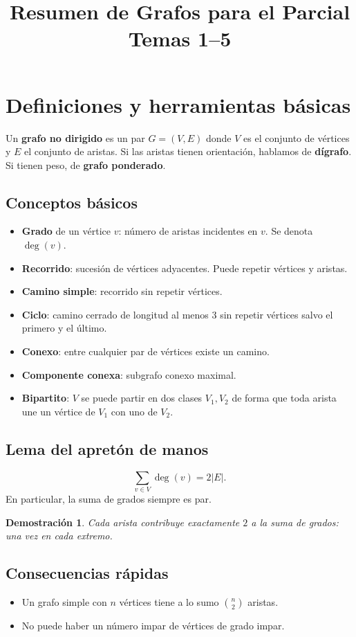 \documentclass[11pt,a4paper]{article}
\title{Resumen de Grafos para el Parcial\\\large Temas 1--5}
\author{}
\date{}
\newtheorem*{dem}{Demostración}
\begin{document}
\maketitle
\tableofcontents
\bigskip

\section{Definiciones y herramientas básicas}

Un \textbf{grafo no dirigido} es un par $G=(V,E)$ donde $V$ es el conjunto de vértices y $E$ el conjunto de aristas. Si las aristas tienen orientación, hablamos de \textbf{dígrafo}. Si tienen peso, de \textbf{grafo ponderado}.

\subsection*{Conceptos básicos}
\begin{itemize}
    \item \textbf{Grado} de un vértice $v$: número de aristas incidentes en $v$. Se denota $\deg(v)$.
    \item \textbf{Recorrido}: sucesión de vértices adyacentes. Puede repetir vértices y aristas.
    \item \textbf{Camino simple}: recorrido sin repetir vértices.
    \item \textbf{Ciclo}: camino cerrado de longitud al menos 3 sin repetir vértices salvo el primero y el último.
    \item \textbf{Conexo}: entre cualquier par de vértices existe un camino.
    \item \textbf{Componente conexa}: subgrafo conexo maximal.
    \item \textbf{Bipartito}: $V$ se puede partir en dos clases $V_1,V_2$ de forma que toda arista une un vértice de $V_1$ con uno de $V_2$.
\end{itemize}

\subsection*{Lema del apretón de manos}
\[
\sum_{v\in V} \deg(v)=2|E|.
\]
En particular, la suma de grados siempre es par.

\begin{dem}
Cada arista contribuye exactamente $2$ a la suma de grados: una vez en cada extremo.
\end{dem}

\subsection*{Consecuencias rápidas}
\begin{itemize}
    \item Un grafo simple con $n$ vértices tiene a lo sumo $\binom{n}{2}$ aristas.
    \item No puede haber un número impar de vértices de grado impar.
\end{itemize}
\end{document}
